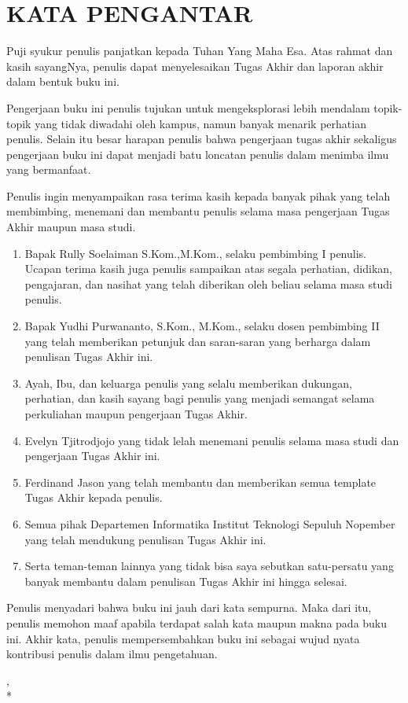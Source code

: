 \chapter {KATA PENGANTAR}

Puji syukur penulis panjatkan kepada Tuhan Yang Maha Esa. Atas rahmat dan kasih sayangNya, penulis dapat menyelesaikan Tugas Akhir dan laporan akhir dalam bentuk buku ini.

Pengerjaan buku ini penulis tujukan untuk mengeksplorasi lebih mendalam topik-topik yang tidak diwadahi oleh kampus, namun banyak menarik perhatian penulis. Selain itu besar harapan penulis bahwa pengerjaan tugas akhir sekaligus pengerjaan buku ini dapat menjadi batu loncatan penulis dalam menimba ilmu yang bermanfaat.

Penulis ingin menyampaikan rasa terima kasih kepada banyak pihak yang telah membimbing, menemani dan membantu penulis selama masa pengerjaan Tugas Akhir maupun masa studi.

\begin {enumerate}
	\item Bapak Rully Soelaiman S.Kom.,M.Kom., selaku pembimbing I penulis. Ucapan terima kasih juga penulis sampaikan atas segala perhatian, didikan, pengajaran, dan nasihat yang telah diberikan oleh beliau selama masa studi penulis.
	\item Bapak Yudhi Purwananto, S.Kom., M.Kom., selaku dosen pembimbing II yang telah memberikan petunjuk dan saran-saran yang berharga dalam penulisan Tugas Akhir ini.
	\item Ayah, Ibu, dan keluarga penulis yang selalu memberikan dukungan, perhatian, dan kasih sayang bagi penulis yang menjadi semangat selama perkuliahan maupun pengerjaan Tugas Akhir.
	\item Evelyn Tjitrodjojo yang tidak lelah menemani penulis selama masa studi dan pengerjaan Tugas Akhir ini.
	\item Ferdinand Jason yang telah membantu dan memberikan semua template Tugas Akhir kepada penulis.
	\item Semua pihak Departemen Informatika Institut Teknologi Sepuluh Nopember yang telah mendukung penulisan Tugas Akhir ini.
	\item Serta teman-teman lainnya yang tidak bisa saya sebutkan satu-persatu yang banyak membantu dalam penulisan Tugas Akhir ini hingga selesai.
\end {enumerate}

Penulis menyadari bahwa buku ini jauh dari kata sempurna. Maka dari itu, penulis memohon maaf apabila terdapat salah kata maupun makna pada buku ini. Akhir kata, penulis mempersembahkan buku ini sebagai wujud nyata kontribusi penulis dalam ilmu pengetahuan.

\begin{flushright}
\lokasi, \tanggal \\*
\vspace{5em}
\penulis
\end{flushright}